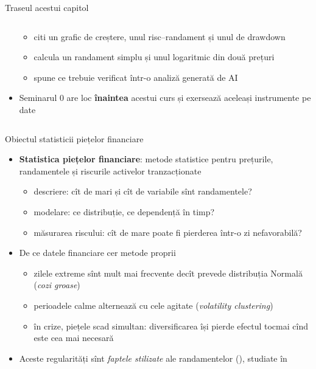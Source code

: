 \begin{frame}{Traseul acestui capitol}
\begin{columns}[T]
\begin{column}{0.48\textwidth}
\begin{itemize}
\begin{itemize}
        \item citi un grafic de creștere, unul risc--randament și unul de drawdown
        \item calcula un randament simplu și unul logaritmic din două prețuri
        \item spune ce trebuie verificat într-o analiză generată de AI
    \end{itemize}
    \item Seminarul 0 are loc \textbf{înaintea} acestui curs și exersează aceleași instrumente pe date
\end{itemize}
\end{column}
\end{columns}
\end{frame}

\begin{frame}{Obiectul statisticii piețelor financiare}
\itemsize{\small}
\begin{itemize}
    \item \textbf{Statistica piețelor financiare}: metode statistice pentru prețurile, randamentele și riscurile activelor tranzacționate
    \begin{itemize}
        \item descriere: cît de mari și cît de variabile sînt randamentele?
        \item modelare: ce distribuție, ce dependență în timp?
        \item măsurarea riscului: cît de mare poate fi pierderea într-o zi nefavorabilă?
    \end{itemize}
    \item De ce datele financiare cer metode proprii
    \begin{itemize}
        \item zilele extreme sînt mult mai frecvente decît prevede distribuția Normală (\emph{cozi groase})
        \item perioadele calme alternează cu cele agitate (\emph{volatility clustering})
        \item în crize, piețele scad simultan: diversificarea își pierde efectul tocmai cînd este cea mai necesară
    \end{itemize}
    \item Aceste regularități sînt \emph{faptele stilizate} ale randamentelor (), studiate în 
\end{itemize}
\end{frame}

